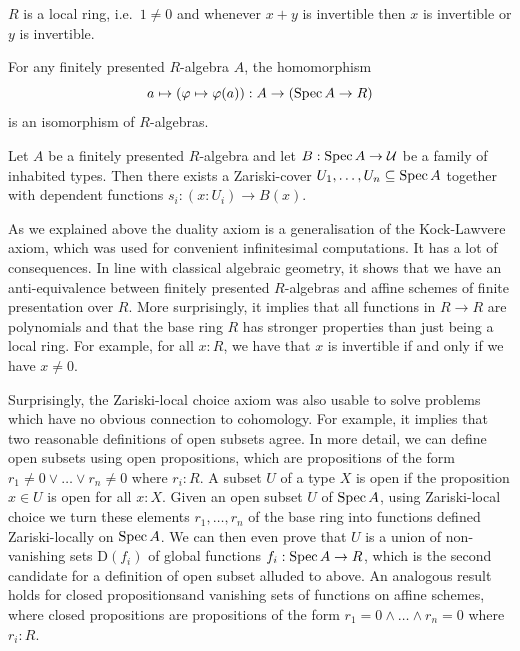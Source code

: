 \begin{center}
\begin{axiom}[Locality]%
  \label{loc-axiom}
  $R$ is a local ring, i.e.\ $1\neq 0$ and whenever $x+y$ is invertible then $x$ is invertible or $y$ is invertible.
\end{axiom}

\begin{axiom}[Duality]%
  \label{duality-axiom}
  For any finitely presented $R$-algebra $A$, the homomorphism
  \[ a \mapsto (\varphi\mapsto \varphi(a)) : A \to (\operatorname{Spec} A \to R)\]
  is an isomorphism of $R$-algebras.
\end{axiom}

\begin{axiom}%
  \label{Z-choice-axiom}
  Let $A$ be a finitely presented $R$-algebra
  and let $B : \operatorname{Spec} A \to \mathcal{U}$ be a family of inhabited types.
  Then there exists a Zariski-cover $U_1,\dots,U_n\subseteq \operatorname{Spec} A$
  together with dependent functions $s_i : (x : U_i)\to B(x)$.
\end{axiom}
\end{center}

As we explained above the duality axiom is a generalisation of the Kock-Lawvere axiom, which was used for convenient infinitesimal computations. It has a lot of consequences. In line with classical algebraic geometry, it shows that we have an anti-equivalence between finitely presented $R$-algebras and affine schemes of finite presentation over $R$.
More surprisingly, it implies that all functions in $R\to R$ are polynomials and that the base ring $R$ has stronger properties than just being a local ring.
For example, for all $x:R$, we have that $x$ is invertible if and only if we have $x\neq 0$.

Surprisingly, the Zariski-local choice axiom was also usable to solve problems which have no obvious connection to cohomology.
For example, it implies that two reasonable definitions of open subsets agree.
In more detail, we can define open subsets using open propositions, which are propositions of the form $r_1\neq 0 \vee\dots\vee r_n\neq 0$ where $r_i:R$.
A subset $U$ of a type $X$ is open if the proposition $x\in U$ is open for all $x:X$.
Given an open subset $U$ of $\operatorname{Spec} A$, using Zariski-local choice we turn these elements $r_1,\dots,r_n$ of the base ring into functions defined Zariski-locally on $\operatorname{Spec} A$.
We can then even prove that $U$ is a union of non-vanishing sets $\mathrm{D}(f_i)$ of global functions $f_i:\operatorname{Spec} A \to R$, which is the second candidate for a definition of open subset alluded to above.
An analogous result holds for closed propositionsand vanishing sets of functions on affine schemes, where closed propositions are propositions of the form $r_1=0\wedge\dots\wedge r_n=0$ where $r_i:R$.

